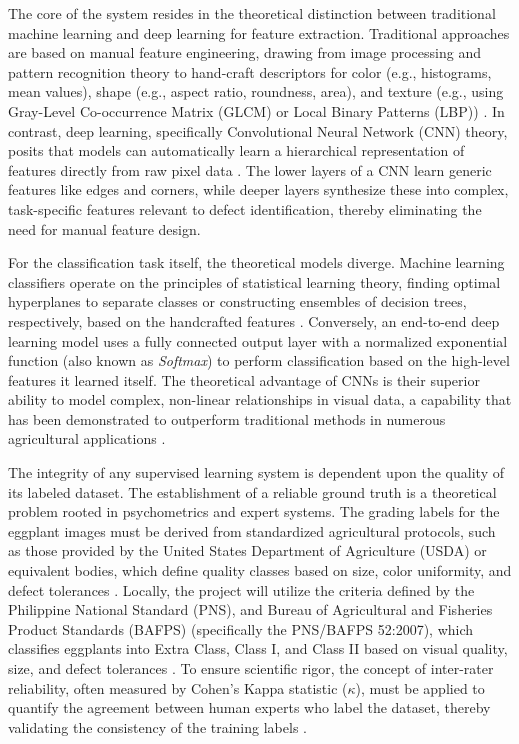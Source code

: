 {The core of the system resides in the theoretical distinction between traditional machine learning and deep learning for feature extraction. Traditional approaches are based on manual feature engineering, drawing from image processing and pattern recognition theory to hand-craft descriptors for color (e.g., histograms, mean values), shape (e.g., aspect ratio, roundness, area), and texture (e.g., using Gray-Level Co-occurrence Matrix (GLCM) or Local Binary Patterns (LBP)) \citep{haralick2007textural,ojala2002multiresolution}. In contrast, deep learning, specifically Convolutional Neural Network (CNN) theory, posits that models can automatically learn a hierarchical representation of features directly from raw pixel data \citep{lecun2015deep,goodfellow2016deep}. The lower layers of a CNN learn generic features like edges and corners, while deeper layers synthesize these into complex, task-specific features relevant to defect identification, thereby eliminating the need for manual feature design.

For the classification task itself, the theoretical models diverge. Machine learning classifiers operate on the principles of statistical learning theory, finding optimal hyperplanes to separate classes or constructing ensembles of decision trees, respectively, based on the handcrafted features \citep{hearst1998support,breiman2001random}. Conversely, an end-to-end deep learning model uses a fully connected output layer with a normalized exponential function (also known as \textit{Softmax}) to perform classification based on the high-level features it learned itself. The theoretical advantage of CNNs is their superior ability to model complex, non-linear relationships in visual data, a capability that has been demonstrated to outperform traditional methods in numerous agricultural applications \citep{bharman2022deep}.

The integrity of any supervised learning system is dependent upon the quality of its labeled dataset. The establishment of a reliable ground truth is a theoretical problem rooted in psychometrics and expert systems. The grading labels for the eggplant images must be derived from standardized agricultural protocols, such as those provided by the United States Department of Agriculture (USDA) or equivalent bodies, which define quality classes based on size, color uniformity, and defect tolerances \citep{USDA2013EggplantStandards}. Locally, the project will utilize the criteria defined by the Philippine National Standard (PNS), and Bureau of Agricultural and Fisheries Product Standards (BAFPS) (specifically the PNS/BAFPS 52:2007), which classifies eggplants into Extra Class, Class I, and Class II based on visual quality, size, and defect tolerances \citep{PNSBAFPS522007_Eggplant,BAFS2019PhilGAP}. To ensure scientific rigor, the concept of inter-rater reliability, often measured by Cohen’s Kappa statistic ($\kappa$), must be applied to quantify the agreement between human experts who label the dataset, thereby validating the consistency of the training labels \citep{mchugh2012interrater,he2022cohens}.

}

